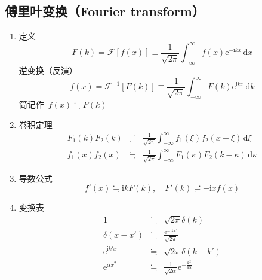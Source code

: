 \documentclass[12pt,a4paper]{article}
\newcommand\diff{\,\mathrm{d}}
\renewcommand{\[}{\ $\displaystyle}
\renewcommand{\]}{$\ }%
\newcommand\mi{\mathrm{i}}
\newcommand\e{\mathrm{e}}
\begin{document}
	\subsection{傅里叶变换（Fourier transform）}
	  \begin{enumerate}
	  	\item 定义
	  		 $$
	  		   F(k) = \mathscr{F}[f(x)] \equiv \frac 1{\sqrt{2\pi}}\int_{-\infty}^\infty f(x)\e^{-\mi kx}\diff x
	  		 $$
	  		 逆变换（反演）
	  		 $$
	  		   f(x) = \mathscr{F}^{-1}[F(k)]\equiv \frac 1{\sqrt{2\pi}}\int_{-\infty}^{\infty}F(k)\e^{\mi kx}\diff k
	  		 $$
	  		 简记作\[f(x)\fallingdotseq F(k)\]
	  	\item 卷积定理
	  		\begin{eqnarray*}
	  		  F_1(k)F_2(k) &\risingdotseq & \frac 1{\sqrt{2\pi}}\int_{-\infty}^{\infty}f_1(\xi)f_2(x-\xi)\diff\xi \\
	  		  f_1(x)f_2(x) &\fallingdotseq & \frac 1{\sqrt{2\pi}}\int_{-\infty}^{\infty}F_1(\kappa)F_2(k-\kappa)\diff\kappa
	  		\end{eqnarray*}
	  	\item 导数公式
	  	$$f'(x)\fallingdotseq \mi kF(k),\quad F'(k)\risingdotseq -\mi xf(x)$$
	  	\item  变换表
	  		\begin{eqnarray*}
	  		  1 &\fallingdotseq & \sqrt{2\pi}\delta(k) \\
	  		  \delta(x-x') &\fallingdotseq & \frac{\e^{-\mi kx'}}{\sqrt{2\pi}} \\
	  		  \e^{\mi k'x}&\fallingdotseq & \sqrt{2\pi}\delta(k-k') \\
	  		  \e^{\alpha x^2} &\fallingdotseq & \frac{1}{\sqrt{2\alpha}}\e^{-\frac{k^2}{4\alpha}}

\end{eqnarray*}
\end{enumerate}
\end{document}
